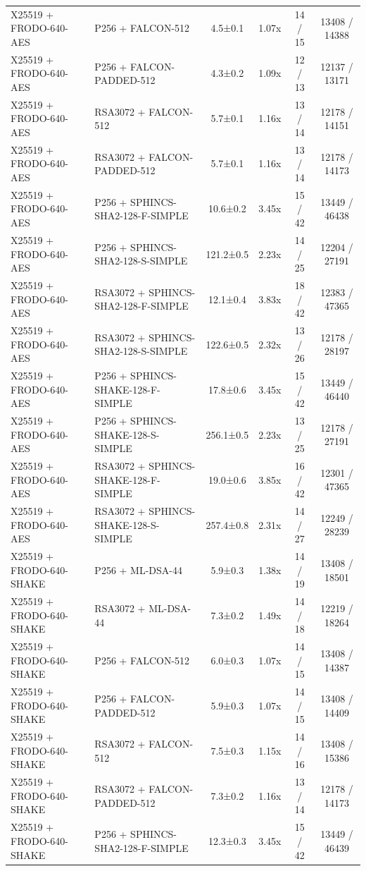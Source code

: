 \documentclass[10pt]{article}
\begin{document}
\begin{tabular}{@{}l l c c c c@{}}
X25519 + FRODO-640-AES & P256 + FALCON-512 & 4.5±0.1 & 1.07x & 14 / 15 & 13408 / 14388 \\
X25519 + FRODO-640-AES & P256 + FALCON-PADDED-512 & 4.3±0.2 & 1.09x & 12 / 13 & 12137 / 13171 \\
X25519 + FRODO-640-AES & RSA3072 + FALCON-512 & 5.7±0.1 & 1.16x & 13 / 14 & 12178 / 14151 \\
X25519 + FRODO-640-AES & RSA3072 + FALCON-PADDED-512 & 5.7±0.1 & 1.16x & 13 / 14 & 12178 / 14173 \\
X25519 + FRODO-640-AES & P256 + SPHINCS-SHA2-128-F-SIMPLE & 10.6±0.2 & 3.45x & 15 / 42 & 13449 / 46438 \\
X25519 + FRODO-640-AES & P256 + SPHINCS-SHA2-128-S-SIMPLE & 121.2±0.5 & 2.23x & 14 / 25 & 12204 / 27191 \\
X25519 + FRODO-640-AES & RSA3072 + SPHINCS-SHA2-128-F-SIMPLE & 12.1±0.4 & 3.83x & 18 / 42 & 12383 / 47365 \\
X25519 + FRODO-640-AES & RSA3072 + SPHINCS-SHA2-128-S-SIMPLE & 122.6±0.5 & 2.32x & 13 / 26 & 12178 / 28197 \\
X25519 + FRODO-640-AES & P256 + SPHINCS-SHAKE-128-F-SIMPLE & 17.8±0.6 & 3.45x & 15 / 42 & 13449 / 46440 \\
X25519 + FRODO-640-AES & P256 + SPHINCS-SHAKE-128-S-SIMPLE & 256.1±0.5 & 2.23x & 13 / 25 & 12178 / 27191 \\
X25519 + FRODO-640-AES & RSA3072 + SPHINCS-SHAKE-128-F-SIMPLE & 19.0±0.6 & 3.85x & 16 / 42 & 12301 / 47365 \\
X25519 + FRODO-640-AES & RSA3072 + SPHINCS-SHAKE-128-S-SIMPLE & 257.4±0.8 & 2.31x & 14 / 27 & 12249 / 28239 \\
X25519 + FRODO-640-SHAKE & P256 + ML-DSA-44 & 5.9±0.3 & 1.38x & 14 / 19 & 13408 / 18501 \\
X25519 + FRODO-640-SHAKE & RSA3072 + ML-DSA-44 & 7.3±0.2 & 1.49x & 14 / 18 & 12219 / 18264 \\
X25519 + FRODO-640-SHAKE & P256 + FALCON-512 & 6.0±0.3 & 1.07x & 14 / 15 & 13408 / 14387 \\
X25519 + FRODO-640-SHAKE & P256 + FALCON-PADDED-512 & 5.9±0.3 & 1.07x & 14 / 15 & 13408 / 14409 \\
X25519 + FRODO-640-SHAKE & RSA3072 + FALCON-512 & 7.5±0.3 & 1.15x & 14 / 16 & 13408 / 15386 \\
X25519 + FRODO-640-SHAKE & RSA3072 + FALCON-PADDED-512 & 7.3±0.2 & 1.16x & 13 / 14 & 12178 / 14173 \\
X25519 + FRODO-640-SHAKE & P256 + SPHINCS-SHA2-128-F-SIMPLE & 12.3±0.3 & 3.45x & 15 / 42 & 13449 / 46439 \\

\end{tabular}
\end{document}
